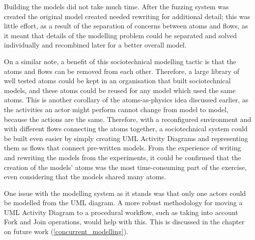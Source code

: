 Building the models did not take much time. After the fuzzing system was created the original model created needed rewriting for additional detail; this was little effort, as a result of the separation of concerns between atoms and flows, as it meant that details of the modelling problem could be separated and solved individually and recombined later for a better overall model. \par

On a similar note, a benefit of this sociotechnical modelling tactic is that the atoms and flows can be removed from each other. Therefore, a large library of well tested atoms could be kept in an organisation that built sociotechnical models, and these atoms could be reused for any model which used the same atoms. This is another corollary of the atoms-as-physics idea discussed earlier, as the activities an actor might perform cannot change from model to model, because the actions are the same. Therefore, with a reconfigured environment and with different flows connecting the atoms together, a sociotechnical system could be built even easier by simply creating UML Activity Diagrams and representing them as flows that connect pre-written models. From the experience of writing and rewriting the models from the experiments, it could be confirmed that the creation of the models' atoms was the most time-consuming part of the exercise, even considering that the models shared many atoms. \par

One issue with the modelling system as it stands was that only one actors could be modelled from the UML diagram. A more robust methodology for moving a UML Activity Diagram to a procedural workflow, such as taking into account Fork and Join operations, would help with this. This is discussed in the chapter on future work (\cref{concurrent_modelling}). \par